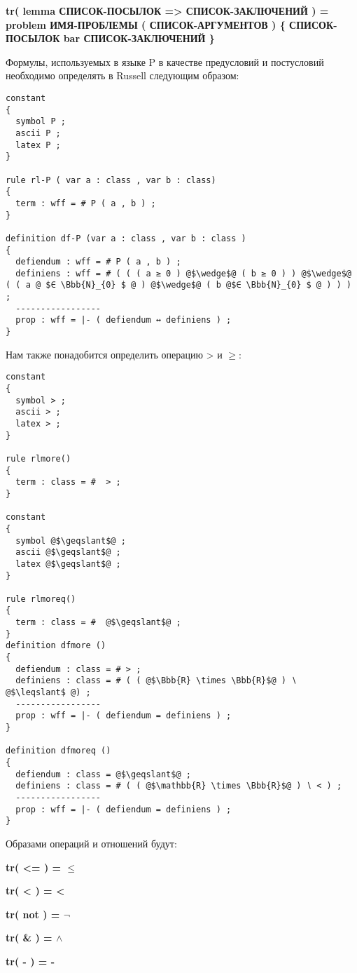 \documentclass[10pt,a4paper]{article}
\begin{document}
\begin{flushleft}
\textbf{tr( lemma СПИСОК-ПОСЫЛОК => СПИСОК-ЗАКЛЮЧЕНИЙ )  = problem ИМЯ-ПРОБЛЕМЫ ( СПИСОК-АРГУМЕНТОВ ) \{ СПИСОК-ПОСЫЛОК bar СПИСОК-ЗАКЛЮЧЕНИЙ \} }

Формулы, используемых в языке P в качестве предусловий и постусловий необходимо определять в Russell следующим образом:
\begin{lstlisting}
constant
{
  symbol P ;
  ascii P ;
  latex P ;
}

rule rl-P ( var a : class , var b : class)
{
  term : wff = # P ( a , b ) ;
}

definition df-P (var a : class , var b : class )
{
  defiendum : wff = # P ( a , b ) ;
  definiens : wff = # ( ( ( a ≥ 0 ) @$\wedge$@ ( b ≥ 0 ) ) @$\wedge$@ ( ( a @ $∈ \Bbb{N}_{0} $ @ ) @$\wedge$@ ( b @$∈ \Bbb{N}_{0} $ @ ) ) ) ;
  -----------------
  prop : wff = |- ( defiendum ↔ definiens ) ;
}

\end{lstlisting}


\begin{flushleft}
Нам также понадобится определить операцию >  и  $\geqslant$:
\begin{lstlisting}
constant
{
  symbol > ;
  ascii > ;
  latex > ;
}

rule rlmore()
{
  term : class = #  > ;
}

constant
{
  symbol @$\geqslant$@ ;
  ascii @$\geqslant$@ ;
  latex @$\geqslant$@ ;
}

rule rlmoreq()
{
  term : class = #  @$\geqslant$@ ;
}
definition dfmore ()
{
  defiendum : class = # > ;
  definiens : class = # ( ( @$\Bbb{R} \times \Bbb{R}$@ ) ∖ @$\leqslant$ @) ;
  -----------------
  prop : wff = |- ( defiendum = definiens ) ;
}

definition dfmoreq ()
{
  defiendum : class = @$\geqslant$@ ;
  definiens : class = # ( ( @$\mathbb{R} \times \Bbb{R}$@ ) ∖ < ) ;
  -----------------
  prop : wff = |- ( defiendum = definiens ) ;
}
\end{lstlisting}
\end{flushleft}
\begin{flushleft}
Образами операций и отношений будут:
\end{flushleft}
\textbf{tr( <= )  =  $\leq $}

\textbf{tr( < )  = < }

\textbf{tr( not )  = $ \neg $}

\textbf{tr( \& )  = $ \wedge $}

\textbf{tr( - )  = - }
\end{flushleft}
\end{document}
